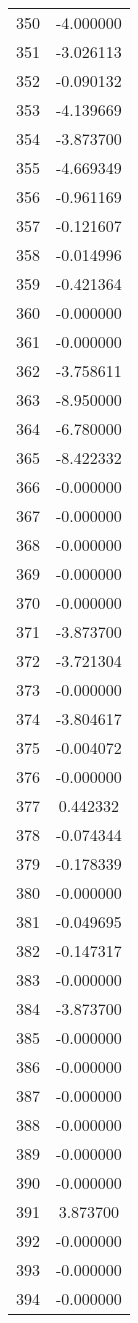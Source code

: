 \documentclass[12pt]{article}
\begin{document}
\begin{longtable}{@{}cc@{}}
350 & -4.000000 \\
351 & -3.026113 \\
352 & -0.090132 \\
353 & -4.139669 \\
354 & -3.873700 \\
355 & -4.669349 \\
356 & -0.961169 \\
357 & -0.121607 \\
358 & -0.014996 \\
359 & -0.421364 \\
360 & -0.000000 \\
361 & -0.000000 \\
362 & -3.758611 \\
363 & -8.950000 \\
364 & -6.780000 \\
365 & -8.422332 \\
366 & -0.000000 \\
367 & -0.000000 \\
368 & -0.000000 \\
369 & -0.000000 \\
370 & -0.000000 \\
371 & -3.873700 \\
372 & -3.721304 \\
373 & -0.000000 \\
374 & -3.804617 \\
375 & -0.004072 \\
376 & -0.000000 \\
377 & 0.442332 \\
378 & -0.074344 \\
379 & -0.178339 \\
380 & -0.000000 \\
381 & -0.049695 \\
382 & -0.147317 \\
383 & -0.000000 \\
384 & -3.873700 \\
385 & -0.000000 \\
386 & -0.000000 \\
387 & -0.000000 \\
388 & -0.000000 \\
389 & -0.000000 \\
390 & -0.000000 \\
391 & 3.873700 \\
392 & -0.000000 \\
393 & -0.000000 \\
394 & -0.000000 \\

\end{longtable}
\end{document}
